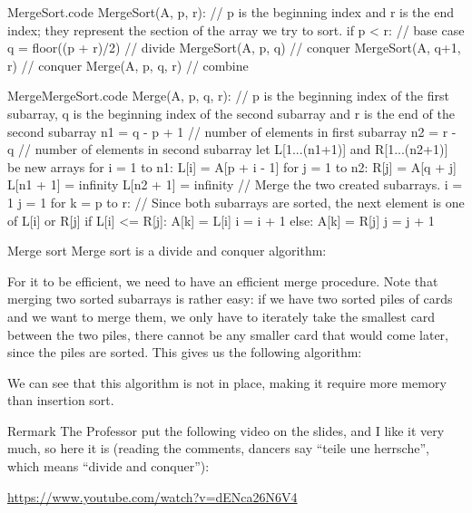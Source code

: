 \documentclass[a4paper]{article}
\begin{document}
\begin{filecontents*}[overwrite]{MergeSort.code}
MergeSort(A, p, r):
    // p is the beginning index and r is the end index; they represent the section of the array we try to sort.
    if p < r:  // base case
        q = floor((p + r)/2)  // divide
        MergeSort(A, p, q)  // conquer
        MergeSort(A, q+1, r)  // conquer
        Merge(A, p, q, r)  // combine
\end{filecontents*}

\begin{filecontents*}[overwrite]{MergeMergeSort.code}
Merge(A, p, q, r):
    // p is the beginning index of the first subarray, q is the beginning index of the second subarray and r is the end of the second subarray
    n1 = q - p + 1 // number of elements in first subarray
    n2 = r - q  // number of elements in second subarray
    let L[1...(n1+1)] and R[1...(n2+1)] be new arrays
    for i = 1 to n1:
        L[i] = A[p + i - 1]
    for j = 1 to n2:
        R[j] = A[q + j]
    L[n1 + 1] = infinity
    L[n2 + 1] = infinity
    // Merge the two created subarrays.
    i = 1
    j = 1
    for k = p to r:
        // Since both subarrays are sorted, the next element is one of L[i] or R[j]
        if L[i] <= R[j]:
            A[k] = L[i]
            i = i + 1
        else:
            A[k] = R[j]
            j = j + 1
\end{filecontents*}


\begin{parag}{Merge sort}
    Merge sort is a divide and conquer algorithm:

    For it to be efficient, we need to have an efficient merge procedure. Note that merging two sorted subarrays is rather easy: if we have two sorted piles of cards and we want to merge them, we only have to iterately take the smallest card between the two piles, there cannot be any smaller card that would come later, since the piles are sorted. This gives us the following algorithm:

    We can see that this algorithm is not in place, making it require more memory than insertion sort.

    \begin{subparag}{Rermark}
        The Professor put the following video on the slides, and I like it very much, so here it is (reading the comments, dancers say ``teile une herrsche'', which means ``divide and conquer''):
        \begin{center}
            \url{https://www.youtube.com/watch?v=dENca26N6V4}
        \end{center}
        
    \end{subparag}
    
\end{parag}
\end{document}
